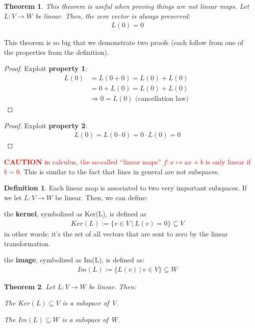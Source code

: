 \documentclass[a4paper, 12pt]{article}
\newtheorem{theorem}{Theorem}
\theoremstyle{definition}
\theoremstyle{definition}
\newtheorem{defn}{Definition}[section]
\theoremstyle{definition}
\theoremstyle{definition}
\newenvironment{enumerate_tight}{
	\begin{enumerate}
		\setlength{\itemsep}{0pt}
		\setlength{\parskip}{0pt}
	}{\end{enumerate}}
\begin{document}
{\begin{theorem}
	This theorem is useful when proving things are not linear maps. Let $L : V \rightarrow W$ be linear. Then, the zero vector is always preserved: 
	\begin{align*}
		L(0) = 0 
	\end{align*}
\end{theorem}
This theorem is so big that we demonstrate two proofs (each follow from one of the properties from the definition). 
\begin{proof}
	Exploit \textbf{property 1}: 
	\begin{align*}
		L(0) &  = L(0 + 0) = L(0) + L(0) \\
		& = 0 + L(0) = L(0) + L(0) \\
		& \Rightarrow 0 = L(0) \mbox{ (cancellation law) } 
	\end{align*}
\end{proof}
\begin{proof}
	 Exploit \textbf{property 2}: 
	 \begin{align*}
	 	L(0) = L(0 \cdot 0) = 0 \cdot L(0) = 0 
	 \end{align*}
\end{proof}
\textcolor{red}{\textbf{CAUTION} \newline 
			in calculus, the so-called ``linear maps'' $f: x \mapsto ax + b$ is only linear if $b=0$}. This is similar to the fact that lines in general are not subspaces. 
\begin{defn}
	Each linear map is associated to two very important subspaces. If we let $L: V \rightarrow W$ be linear. Then, we can define: 
	\begin{enumerate_tight}
		\item the \textbf{kernel}, symbolized as Ker(L), is defined as 
		\begin{align}
			Ker(L) := \{ v \in V\ |\ L(v) = 0 \} \subseteq V
		\end{align}
		in other words: it's the set of all vectors that are sent to zero by the linear transformation. 
		\item the \textbf{image}, symbolized as Im(L), is defined as: 
		\begin{align} 
			Im(L) := \{ L(v)\ |\ v \in V \} \subseteq W
		\end{align} 
	\end{enumerate_tight}
\end{defn}

\begin{theorem}
	Let $L : V \rightarrow W$ be linear. Then: 
	\begin{enumerate_tight}
		\item The $Ker(L) \subseteq V$ is a subspace of V. 
		\item The $Im(L) \subseteq W$ is a subspace of W. 
	\end{enumerate_tight}
	

\end{theorem}}
\end{document}
